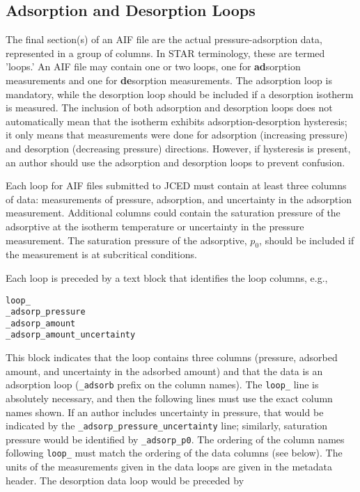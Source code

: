 \documentclass[preprint,pre,showkeys,12pt,superscriptaddress,nofootinbib,endfloats*]{revtex4-1}
\begin{document}
\subsection{Adsorption and Desorption Loops}\label{ssec:loops}

The final section(s) of an AIF file are the actual pressure-adsorption data, represented in a group of columns. In STAR terminology, these are termed 'loops.' An AIF file may contain one or two loops, one for {\bf ad}sorption measurements and one for {\bf de}sorption measurements. The adsorption loop is mandatory, while the desorption loop should be included if a desorption isotherm is measured. The inclusion of both adsorption and desorption loops does not automatically mean that the isotherm exhibits adsorption-desorption hysteresis; it only means that measurements were done for adsorption (increasing pressure) and desorption (decreasing pressure) directions. However, if hysteresis is present, an author should use the adsorption and desorption loops to prevent confusion.

Each loop for AIF files submitted to JCED must contain at least three columns of data: measurements of pressure, adsorption, and uncertainty in the adsorption measurement. Additional columns could contain the saturation pressure of the adsorptive at the isotherm temperature or uncertainty in the pressure measurement. The saturation pressure of the adsorptive, $p_0$, should be included if the measurement is at subcritical conditions.

Each loop is preceded by a text block that identifies the loop columns, e.g.,

\begin{verbatim}
loop_
_adsorp_pressure
_adsorp_amount
_adsorp_amount_uncertainty
\end{verbatim}

\noindent This block indicates that the loop contains three columns (pressure, adsorbed amount, and uncertainty in the adsorbed amount) and that the data is an adsorption loop (\verb!_adsorb! prefix on the column names). The \verb!loop_! line is absolutely necessary, and then the following lines must use the exact column names shown. If an author includes uncertainty in pressure, that would be indicated by the \verb!_adsorp_pressure_uncertainty! line; similarly, saturation pressure would be identified by \verb!_adsorp_p0!. The ordering of the column names following \verb!loop_! must match the ordering of the data columns (see below). The units of the measurements given in the data loops are given in the metadata header. The desorption data loop would be preceded by
\end{document}
